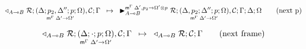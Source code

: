 \begin{align}
\trans{\contstate{A \lolli B}{\rulestk}{\lframe{\Delta}{p_2,
   \Delta''}{p}{\Omega}{\Delta'}{\Omega'}, \lstack{C}}{\Gamma}}
{
   \matstate{A \lolli B}{\rulestk}{\lframe{\Delta,
      p_2}{\Delta''}{p}{\Omega}{\Delta'}{\Omega'},
   \lstack{C}}{\Gamma}{\Delta}{\Omega}{\Delta', p_2 \rightarrow \Omega' \otimes p}}
   \tag{next p}
\end{align}

\begin{align}
\trans{\contstate{A \lolli
   B}{\rulestk}{\lframe{\Delta}{\cdot}{p}{\Omega}{\Delta'}{\Omega'},
      \lstack{C}}{\Gamma}}
{
   \contstate{A \lolli B}{\rulestk}{\lstack{C}}{\Gamma}} \tag{next frame}
\end{align}
